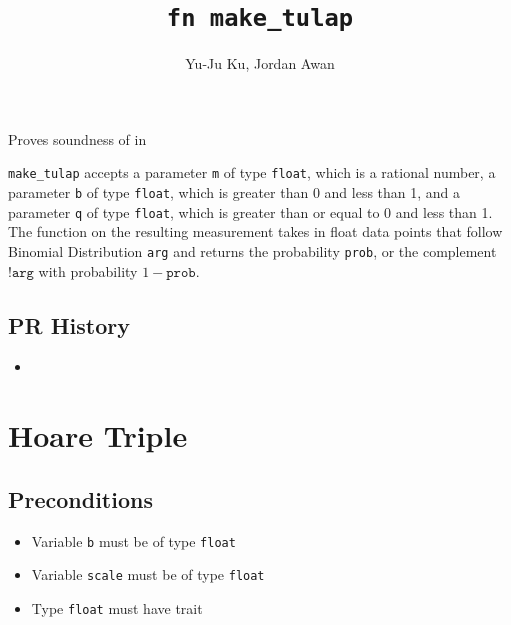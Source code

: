 \documentclass{article}
\title{\texttt{fn make\_tulap}}
\author{Yu-Ju Ku, Jordan Awan}
\begin{document}
\maketitle

\contrib

Proves soundness of  in 

\texttt{make\_tulap} accepts a parameter \texttt{m} of type \texttt{float}, which is a rational number, a parameter \texttt{b} of type \texttt{float}, which is greater than 0 and less than 1, and a parameter \texttt{q} of type \texttt{float}, which is greater than or equal to 0 and less than 1.
The function on the resulting measurement takes in float data points that follow Binomial Distribution \texttt{arg} and returns the probability \texttt{prob}, or the complement $\texttt{!arg}$ with probability $1 - \texttt{prob}$.


\subsection*{PR History}
\begin{itemize}
    \item \vettingPR{}
\end{itemize}

\section{Hoare Triple}

\subsection*{Preconditions}
\begin{itemize}
    \item Variable \texttt{b} must be of type \texttt{float}
    \item Variable \texttt{scale} must be of type \texttt{float}
    \item Type \texttt{float} must have trait 
\end{itemize}
\end{document}
